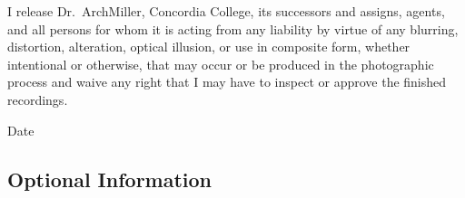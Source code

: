 \documentclass{tufte-handout}
\begin{document}
I release Dr.~ArchMiller, Concordia College, its successors and assigns, agents, and all persons for whom it is acting from any liability by virtue of any blurring, distortion, alteration, optical illusion, or use in composite form, whether intentional or otherwise, that may occur or be produced in the photographic process and waive any right that I may have to inspect or approve the finished recordings.

  \hrulefill
{}  \underline{\hspace{5cm}} {Date}  \hrulefill

\subsection{Optional Information}

 \hrulefill

 \hrulefill

 \hrulefill

 \hrulefill


 \hrulefill

\hrulefill

 \hrulefill

 \hrulefill

\hrulefill

\hrulefill

\hrulefill
\end{document}
